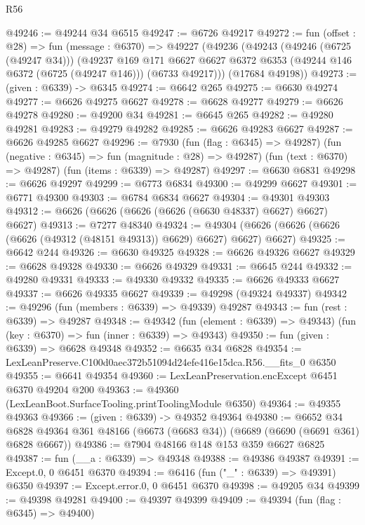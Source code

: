 \begin{lexlean}{R56}
\begin{coremodule}
@49246 := @49244 @34 @6515
@49247 := @6726 @49217
@49272 := fun (offset : @28) =>
  fun (message : @6370) =>
  @49227
    (@49236
      (@49243
        (@49246 (@6725 (@49247 @34)))
        (@49237
          @169
          @171
          @6627
          @6627
          @6372
          @6353
          (@49244 @146 @6372 (@6725 (@49247 @146)))
          (@6733 @49217)))
      (@17684 @49198))
@49273 := (given : @6339) -> @6345
@49274 := @6642 @265
@49275 := @6630 @49274
@49277 := @6626 @49275 @6627
@49278 := @6628 @49277
@49279 := @6626 @49278
@49280 := @49200 @34
@49281 := @6645 @265
@49282 := @49280 @49281
@49283 := @49279 @49282
@49285 := @6626 @49283 @6627
@49287 := @6626 @49285 @6627
@49296 := @7930
    (fun (flag : @6345) => @49287)
    (fun (negative : @6345) => fun (magnitude : @28) => @49287)
    (fun (text : @6370) => @49287)
    (fun (items : @6339) => @49287)
@49297 := @6630 @6831
@49298 := @6626 @49297
@49299 := @6773 @6834
@49300 := @49299 @6627
@49301 := @6771 @49300
@49303 := @6784 @6834 @6627
@49304 := @49301 @49303
@49312 := @6626 (@6626 (@6626 (@6626 (@6630 @48337) @6627) @6627) @6627)
@49313 := @7277 @48340
@49324 := @49304 (@6626 (@6626 (@6626 (@6626 (@49312 (@48151 @49313)) @6629) @6627) @6627) @6627)
@49325 := @6642 @244
@49326 := @6630 @49325
@49328 := @6626 @49326 @6627
@49329 := @6628 @49328
@49330 := @6626 @49329
@49331 := @6645 @244
@49332 := @49280 @49331
@49333 := @49330 @49332
@49335 := @6626 @49333 @6627
@49337 := @6626 @49335 @6627
@49339 := @49298 (@49324 @49337)
@49342 := @49296 (fun (members : @6339) => @49339) @49287
@49343 := fun (rest : @6339) => @49287
@49348 := @49342
    (fun (element : @6339) => @49343)
    (fun (key : @6370) => fun (inner : @6339) => @49343)
@49350 := fun (given : @6339) => @6628 @49348
@49352 := @6635 @34 @6828
@49354 := LexLeanPreserve.C100d0aec372b51094d24efe416e15dca.R56.__fits_0 @6350
@49355 := @6641 @49354
@49360 := LexLeanPreservation.encExcept @6451 @6370 @49204 @200
@49363 := @49360 (LexLeanBoot.SurfaceTooling.printToolingModule @6350)
@49364 := @49355 @49363
@49366 := (given : @6339) -> @49352 @49364
@49380 := @6652
    @34
    @6828
    @49364
    @361
    @48166
    (@6673 (@6683 @34))
    (@6689 (@6690 (@6691 @361) @6828 @6667))
@49386 := @7904 @48166 @148 @153 @359 @6627 @6825
@49387 := fun (__a : @6339) => @49348
@49388 := @49386 @49387
@49391 := Except.{0, 0} @6451 @6370
@49394 := @6416 (fun ("_" : @6339) => @49391) @6350
@49397 := Except.error.{0, 0} @6451 @6370
@49398 := @49205 @34
@49399 := @49398 @49281
@49400 := @49397 @49399
@49409 := @49394
    (fun (flag : @6345) => @49400)

\end{coremodule}
\end{lexlean}
